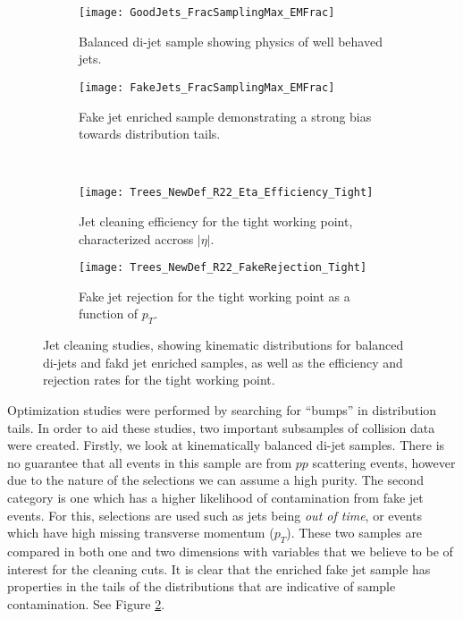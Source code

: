 \documentclass[12pt]{article}
\begin{document}
\begin{figure}[t!]
    \centering
    \begin{subfigure}[t]{.48\textwidth}
        \centering
        \texttt{[image: GoodJets\_FracSamplingMax\_EMFrac]}
        \caption{Balanced di-jet sample showing physics of well behaved jets.}
        \label{subfig:good_jets_th2}
    \end{subfigure}
    \hfill
    \begin{subfigure}[t]{.48\textwidth}
        \centering
        \texttt{[image: FakeJets\_FracSamplingMax\_EMFrac]}
        \caption{Fake jet enriched sample demonstrating a strong bias towards
        distribution tails.}
        \label{subfig:fake_jets_th2}
    \end{subfigure} %
    ~
    \begin{subfigure}[t]{.48\textwidth}
        \centering
        \texttt{[image: Trees\_NewDef\_R22\_Eta\_Efficiency\_Tight]}
        \caption{Jet cleaning efficiency for the tight working point,
        characterized accross $|\eta|$.}
        \label{subfig:cleaning_perf_th2_loose}
    \end{subfigure}
    \hfill
    \begin{subfigure}[t]{.48\textwidth}
        \centering
        \texttt{[image: Trees\_NewDef\_R22\_FakeRejection\_Tight]}
        \caption{Fake jet rejection for the tight working point as a function of
        $p_T$.}
        \label{subfig:cleaning_perf_th2_tight}
    \end{subfigure}
\caption{Jet cleaning studies, showing kinematic distributions for balanced
di-jets and fakd jet enriched samples, as well as the efficiency and rejection
rates for the tight working point.}
\label{fig:jet_cleaning}
\end{figure}
Optimization studies were performed by searching for ``bumps'' in
distribution tails. In order to aid these studies, two important subsamples of
collision data were created. Firstly, we look at kinematically balanced di-jet
samples. There is no guarantee that all events in this sample are from $pp$
scattering events, however due to the nature of the selections we can assume a
high purity. The second category is one which has a higher likelihood of
contamination from fake jet events. For this, selections are used such as jets
being \textit{out of time}, or events which have high missing transverse
momentum ($p_T$). These two samples are compared in both one and two dimensions with
variables that we believe to be of interest for the cleaning cuts. It is clear
that the enriched fake jet sample has properties in the tails of the
distributions that are indicative of sample contamination. See Figure
\ref{subfig:fake_jets_th2}. 
\end{document}

